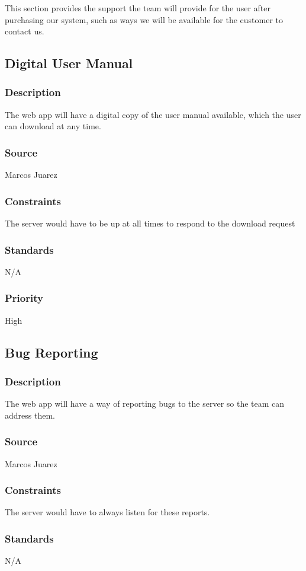 This section provides the support the team will provide for the user after purchasing our system, such as ways we will be available for the customer to contact us.

\subsection{Digital User Manual}
\subsubsection{Description}
The web app will have a digital copy of the user manual available, which the user can download at any time.
\subsubsection{Source}
Marcos Juarez
\subsubsection{Constraints}
The server would have to be up at all times to respond to the download request
\subsubsection{Standards}
N/A
\subsubsection{Priority}
High
\newline

\subsection{Bug Reporting}
\subsubsection{Description}
The web app will have a way of reporting bugs to the server so the team can address them.
\subsubsection{Source}
Marcos Juarez
\subsubsection{Constraints}
The server would have to always listen for these reports.
\subsubsection{Standards}
N/A
